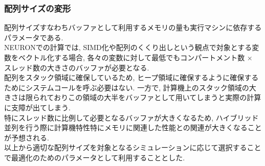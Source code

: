 \subsubsection{配列サイズの変形}
配列サイズすなわちバッファとして利用するメモリの量も実行マシンに依存するパラメータである.\\
NEURONでの計算では, SIMD化や配列のくくり出しという観点で対象とする変数をベクトル化する場合,
各々の変数に対して最低でもコンパートメント数 × スレッド数の大きさのバッファが必要となる.\\
配列をスタック領域に確保しているため, ヒープ領域に確保するように確保するためにシステムコールを呼ぶ必要はない.
一方で, 計算機上のスタック領域の大きさは限られておりこの領域の大半をバッファとして用いてしまうと実際の計算に支障が出てしまう.\\
特にスレッド数に比例して必要となるバッファが大きくなるため, ハイブリッド並列を行う際に計算機特性特にメモリに関連した性能との関連が大きくなることが予想される.\\
以上から適切な配列サイズを対象となるシミュレーションに応じて選択することで最適化のためのパラメータとして利用することとした.\\
